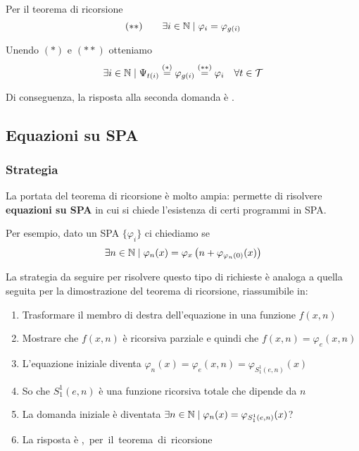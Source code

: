 Per il teorema di ricorsione
$$ (\ast \ast) \quad \quad \exists i \in \mathbb{N} \mid \varphi_i = \varphi_{g(i)} $$

Unendo $(\ast)$ e $(\ast \ast)$ otteniamo
$$ \exists i \in \mathbb{N} \mid \Psi_{t(i)} \stackrel{(\ast)}{=} \varphi_{g(i)} \stackrel{(\ast \ast)}{=} \varphi_i \quad \forall t \in \mathcal{T} $$

Di conseguenza, la risposta alla seconda domanda è \no.

\subsection{Equazioni su SPA}

\subsubsection{Strategia}

La portata del teorema di ricorsione è molto ampia: permette di risolvere \textbf{equazioni su SPA} in cui si chiede l'esistenza di certi programmi in SPA.

Per esempio, dato un SPA $\{\varphi_i\}$ ci chiediamo se
$$ \exists n \in \mathbb{N} \mid \varphi_n (x) = \varphi_x \left(n + \varphi_{\varphi_n (0)} (x) \right) $$

La strategia da seguire per risolvere questo tipo di richieste è analoga a quella seguita per la dimostrazione del teorema di ricorsione, riassumibile in:
\begin{enumerate}
	\item Trasformare il membro di destra dell'equazione in una funzione $f(x,n)$
	
    \item Mostrare che $f(x,n)$ è ricorsiva parziale e quindi che $f(x,n) = \varphi_e (x,n)$
	
    \item L'equazione iniziale diventa $\varphi_n (x) = \varphi_e (x, n) = \varphi_{S^1_1 (e,n)} (x)$
	
    \item So che $S^1_1 (e,n)$ è una funzione ricorsiva totale che dipende da $n$
	
    \item La domanda iniziale è diventata $\exists n \in \mathbb{N} \mid \varphi_n (x) = \varphi_{S_1^1 (e,n)} (x)$?
	
    \item La risposta è \si, per il teorema di ricorsione
\end{enumerate}

